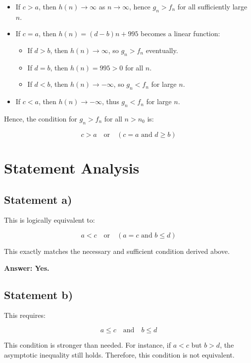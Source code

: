 \documentclass[12pt]{article}
\begin{document}
\begin{itemize}
    \item If \( c > a \), then \( h(n) \to \infty \) as \( n \to \infty \), hence \( g_n > f_n \) for all sufficiently large \( n \).
    
    \item If \( c = a \), then \( h(n) = (d - b)n + 995 \) becomes a linear function:
    \begin{itemize}
        \item If \( d > b \), then \( h(n) \to \infty \), so \( g_n > f_n \) eventually.
        \item If \( d = b \), then \( h(n) = 995 > 0 \) for all \( n \).
        \item If \( d < b \), then \( h(n) \to -\infty \), so \( g_n < f_n \) for large \( n \).
    \end{itemize}
    
    \item If \( c < a \), then \( h(n) \to -\infty \), thus \( g_n < f_n \) for large \( n \).
\end{itemize}

Hence, the condition for \( g_n > f_n \) for all \( n > n_0 \) is:

\[
\boxed{c > a \quad \text{or} \quad (c = a \text{ and } d \geq b)}
\]

\section{Statement Analysis}

\subsection{Statement a)}

This is logically equivalent to:

\[
a < c \quad \text{or} \quad (a = c \text{ and } b \leq d)
\]

This exactly matches the necessary and sufficient condition derived above.

\textbf{Answer: Yes.}

\subsection{Statement b)}

This requires:

\[
a \leq c \quad \text{and} \quad b \leq d
\]

This condition is stronger than needed. For instance, if \( a < c \) but \( b > d \), the asymptotic inequality still holds. Therefore, this condition is not equivalent.
\end{document}
